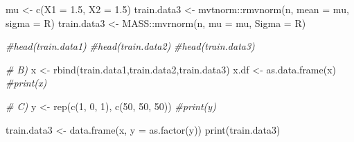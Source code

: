 \documentclass[
]{article}
\newenvironment{Shaded}{\begin{snugshade}}{\end{snugshade}}
\newcommand{\AttributeTok}[1]{\textcolor[rgb]{0.77,0.63,0.00}{#1}}
\newcommand{\CommentTok}[1]{\textcolor[rgb]{0.56,0.35,0.01}{\textit{#1}}}
\newcommand{\DecValTok}[1]{\textcolor[rgb]{0.00,0.00,0.81}{#1}}
\newcommand{\FloatTok}[1]{\textcolor[rgb]{0.00,0.00,0.81}{#1}}
\newcommand{\FunctionTok}[1]{\textcolor[rgb]{0.00,0.00,0.00}{#1}}
\newcommand{\NormalTok}[1]{#1}
\newcommand{\OtherTok}[1]{\textcolor[rgb]{0.56,0.35,0.01}{#1}}
\newcommand{\SpecialCharTok}[1]{\textcolor[rgb]{0.00,0.00,0.00}{#1}}
\begin{document}
\begin{Shaded}
\begin{Highlighting}[]
\NormalTok{mu }\OtherTok{\textless{}{-}} \FunctionTok{c}\NormalTok{(}\AttributeTok{X1 =} \FloatTok{1.5}\NormalTok{, }\AttributeTok{X2 =} \FloatTok{1.5}\NormalTok{)}
\NormalTok{train.data3 }\OtherTok{\textless{}{-}}\NormalTok{ mvtnorm}\SpecialCharTok{::}\FunctionTok{rmvnorm}\NormalTok{(n, }\AttributeTok{mean =}\NormalTok{ mu, }\AttributeTok{sigma =}\NormalTok{ R)}
\NormalTok{train.data3 }\OtherTok{\textless{}{-}}\NormalTok{ MASS}\SpecialCharTok{::}\FunctionTok{mvrnorm}\NormalTok{(n, }\AttributeTok{mu =}\NormalTok{ mu, }\AttributeTok{Sigma =}\NormalTok{ R)}

\CommentTok{\#head(train.data1)}
\CommentTok{\#head(train.data2)}
\CommentTok{\#head(train.data3)}


\CommentTok{\# B)}
\NormalTok{x }\OtherTok{\textless{}{-}} \FunctionTok{rbind}\NormalTok{(train.data1,train.data2,train.data3)}
\NormalTok{x.df }\OtherTok{\textless{}{-}} \FunctionTok{as.data.frame}\NormalTok{(x)}
\CommentTok{\#print(x)}

\CommentTok{\# C)}
\NormalTok{y }\OtherTok{\textless{}{-}} \FunctionTok{rep}\NormalTok{(}\FunctionTok{c}\NormalTok{(}\DecValTok{1}\NormalTok{, }\DecValTok{0}\NormalTok{, }\DecValTok{1}\NormalTok{), }\FunctionTok{c}\NormalTok{(}\DecValTok{50}\NormalTok{, }\DecValTok{50}\NormalTok{, }\DecValTok{50}\NormalTok{))}
\CommentTok{\#print(y)}

\NormalTok{train.data3 }\OtherTok{\textless{}{-}} \FunctionTok{data.frame}\NormalTok{(x, }\AttributeTok{y =} \FunctionTok{as.factor}\NormalTok{(y))}
\FunctionTok{print}\NormalTok{(train.data3)}
\end{Highlighting}
\end{Shaded}
\end{document}

